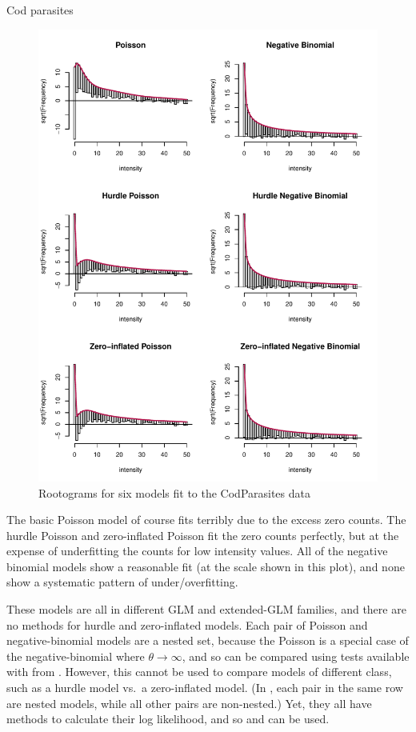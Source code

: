 \documentclass[11pt]{book}\usepackage[]{graphicx}\usepackage[]{color}
\newenvironment{knitrout}{}{} %
\renewenvironment{knitrout}{\small\renewcommand{\baselinestretch}{.85}}{} %
\begin{document}
\begin{Example}[cod2]{Cod parasites}
\begin{knitrout}
\begin{figure}[!htbp]
\centerline{\includegraphics[width=.8\textwidth]{ch09/fig/cod2-rootograms-1} }

\caption[Rootograms for six models fit to the CodParasites data]{Rootograms for six models fit to the CodParasites data\label{fig:cod2-rootograms}}
\end{figure}


\end{knitrout}
The basic Poisson model of course fits terribly due to the excess zero counts.
The hurdle Poisson and zero-inflated Poisson fit the zero counts perfectly, but
at the expense of underfitting the counts for low intensity values.
All of the negative binomial models show a reasonable fit (at the scale shown in this plot),
and none show a systematic pattern of under/overfitting.

These models are all in different GLM and extended-GLM families, and there are no
 methods for hurdle and zero-inflated models.
Each pair of
Poisson and negative-binomial models are a nested set, because the
Poisson is a special case of the negative-binomial where $\theta \rightarrow \infty$,
and so can be compared using \LR tests available with  from .
However, this cannot be used to compare models of different class,
such as a hurdle model vs.\ a zero-inflated model.
(In , each pair in the same row are nested models,
while all other pairs are non-nested.)
Yet, they all have 
methods to calculate their log likelihood, and so  and 
can be used.


\end{Example}
\end{document}
